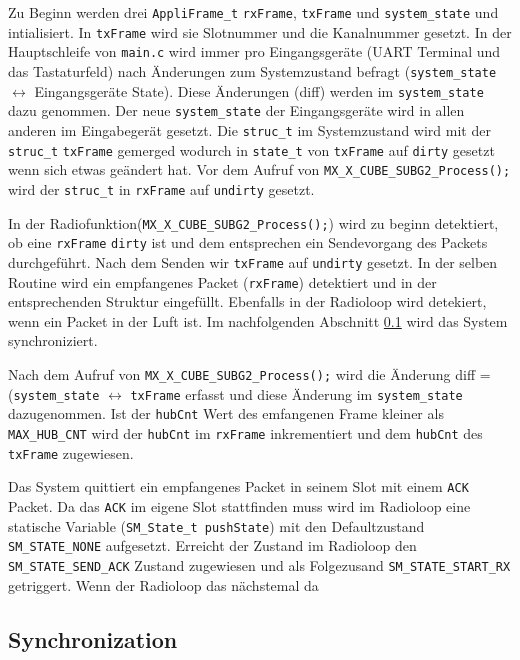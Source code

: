 Zu Beginn werden drei \verb|AppliFrame_t| \verb|rxFrame|, \verb|txFrame| und \verb|system_state| und intialisiert. In \verb|txFrame| wird sie Slotnummer und die Kanalnummer gesetzt. In der Hauptschleife von \verb|main.c| wird immer pro Eingangsgeräte (UART Terminal und das Tastaturfeld) nach Änderungen zum Systemzustand befragt (\verb|system_state| $\leftrightarrow$ Eingangsgeräte State). Diese Änderungen (diff) werden im \verb|system_state| dazu genommen. Der neue \verb|system_state| der Eingangsgeräte wird in allen anderen im Eingabegerät gesetzt. Die \verb|struc_t| im Systemzustand wird mit der \verb|struc_t| \verb|txFrame| gemerged wodurch in \verb|state_t| von \verb|txFrame| auf \verb|dirty| gesetzt wenn sich etwas geändert hat.  Vor dem Aufruf von \verb|MX_X_CUBE_SUBG2_Process();| wird der \verb|struc_t| in \verb|rxFrame| auf \verb|undirty| gesetzt.  

In der Radiofunktion(\verb|MX_X_CUBE_SUBG2_Process();|) wird zu beginn detektiert, ob eine \verb|rxFrame| \verb|dirty| ist und dem entsprechen ein Sendevorgang des Packets durchgeführt. Nach dem Senden wir \verb|txFrame| auf \verb|undirty| gesetzt. In der selben Routine wird ein empfangenes Packet (\verb|rxFrame|) detektiert und in der entsprechenden Struktur eingefüllt. Ebenfalls in der Radioloop wird detekiert, wenn ein Packet in der Luft ist. Im nachfolgenden Abschnitt \ref{sync} wird das System synchroniziert.

Nach dem Aufruf von \verb|MX_X_CUBE_SUBG2_Process();| wird die Änderung diff =  (\verb|system_state| $\leftrightarrow$ \verb|txFrame| erfasst und diese Änderung im \verb|system_state| dazugenommen. Ist der \verb|hubCnt| Wert des emfangenen Frame kleiner als \verb|MAX_HUB_CNT| wird der \verb|hubCnt| im \verb|rxFrame| inkrementiert und dem \verb|hubCnt| des \verb|txFrame| zugewiesen.

Das System quittiert ein empfangenes Packet in seinem Slot mit einem \verb|ACK| Packet. Da das \verb|ACK| im eigene Slot stattfinden muss wird im Radioloop eine statische Variable (\verb|SM_State_t pushState|) mit den Defaultzustand \verb|SM_STATE_NONE| aufgesetzt. Erreicht der Zustand im Radioloop den \verb|SM_STATE_SEND_ACK| Zustand zugewiesen und als Folgezusand \verb|SM_STATE_START_RX| getriggert. Wenn der Radioloop das nächstemal da

\subsection{Synchronization} \label{sync}

